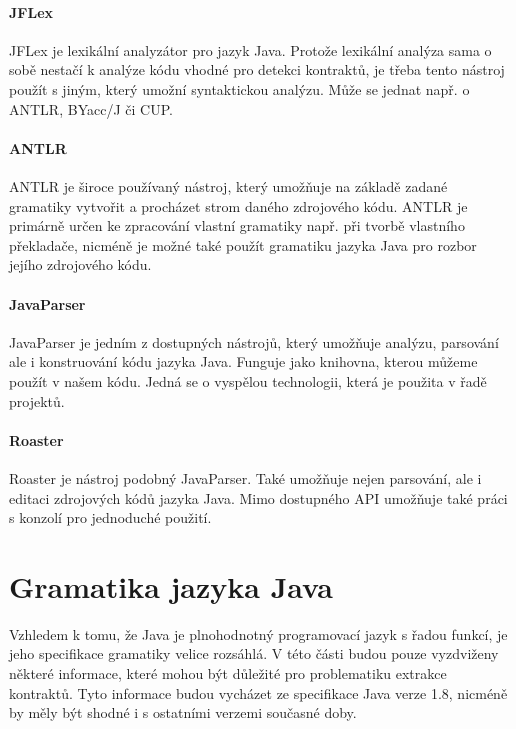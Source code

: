			\paragraph{JFLex}
				JFLex \cite{jflex} je lexikální analyzátor pro jazyk Java. Protože lexikální analýza sama o sobě nestačí k analýze kódu vhodné pro detekci kontraktů, je třeba tento nástroj použít s jiným, který umožní syntaktickou analýzu. Může se jednat např. o ANTLR, BYacc/J či CUP. 						
						
			\paragraph{ANTLR}			
				ANTLR \cite{antlr} je široce používaný nástroj, který umožňuje na základě zadané gramatiky vytvořit a procházet strom daného zdrojového kódu. ANTLR je primárně určen ke zpracování vlastní gramatiky např. při tvorbě vlastního překladače, nicméně je možné také použít gramatiku jazyka Java pro rozbor jejího zdrojového kódu.
			
			\paragraph{JavaParser}
				JavaParser \cite{javaparser} je jedním z dostupných nástrojů, který umožňuje analýzu, parsování ale i konstruování kódu jazyka Java. Funguje jako knihovna, kterou můžeme použít v našem kódu. Jedná se o vyspělou technologii, která je použita v řadě projektů. 
				
			\paragraph{Roaster}
				Roaster \cite{roaster} je nástroj podobný JavaParser. Také umožňuje nejen parsování, ale i editaci zdrojových kódů jazyka Java. Mimo dostupného API umožňuje také práci s konzolí  pro jednoduché použití.
	

	\section{Gramatika jazyka Java}
		Vzhledem k tomu, že Java je plnohodnotný programovací jazyk s řadou funkcí, je jeho specifikace gramatiky \cite{javaGrammar} velice rozsáhlá. V této části budou pouze vyzdviženy některé informace, které mohou být důležité pro problematiku extrakce kontraktů. Tyto informace budou vycházet ze specifikace Java verze 1.8, nicméně by měly být shodné i s ostatními verzemi současné doby.\\
		
